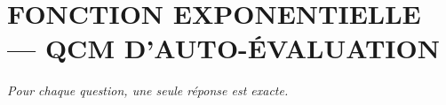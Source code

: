 
\section*{\textcolor{chapcolor}{\MakeUppercase{Fonction exponentielle — QCM d'auto-évaluation}}}

\begin{center}
\textit{Pour chaque question, une seule réponse est exacte.}
\end{center}

